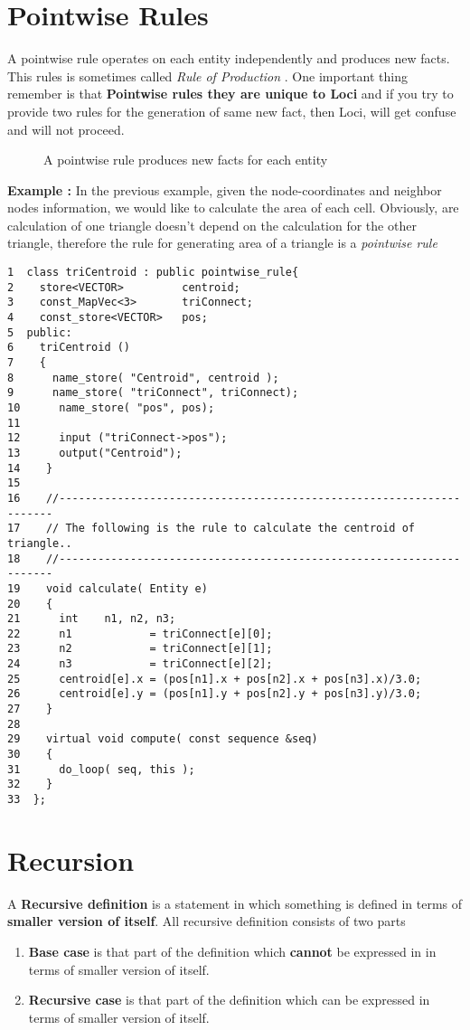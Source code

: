 \section{ Pointwise Rules }
A pointwise rule operates on each entity independently and produces new facts. This
rules is sometimes called {\em Rule of Production }.  
One important thing remember is that {\bf Pointwise rules they are unique
to Loci} and if you try to provide two rules for the generation of same new fact,
then Loci, will get confuse and will not proceed.
%
\begin{figure}[h]
\vspace{2.50in}\caption { A pointwise rule produces new facts for each entity  }
\label {FigLocalReduction}
\end{figure}
%
\par {\bf Example : } In the previous example, given the node-coordinates and 
neighbor nodes information, we would like to calculate the area of each
cell. Obviously, are calculation of one triangle doesn't depend on the 
calculation for the other triangle, therefore the rule for generating
area of a triangle is a {\em pointwise rule}
\begin{verbatim}
1  class triCentroid : public pointwise_rule{
2    store<VECTOR>         centroid;
3    const_MapVec<3>       triConnect;
4    const_store<VECTOR>   pos;
5  public:
6    triCentroid ()
7    {
8      name_store( "Centroid", centroid );
9      name_store( "triConnect", triConnect);
10      name_store( "pos", pos);
11
12      input ("triConnect->pos");
13      output("Centroid");
14    }
15
16    //---------------------------------------------------------------------
17    // The following is the rule to calculate the centroid of triangle..
18    //---------------------------------------------------------------------
19    void calculate( Entity e)
20    {
21      int    n1, n2, n3;
22      n1            = triConnect[e][0];
23      n2            = triConnect[e][1];
24      n3            = triConnect[e][2];
25      centroid[e].x = (pos[n1].x + pos[n2].x + pos[n3].x)/3.0;
26      centroid[e].y = (pos[n1].y + pos[n2].y + pos[n3].y)/3.0;
27    }
28
29    virtual void compute( const sequence &seq)
30    {
31      do_loop( seq, this );
32    }
33  };
\end{verbatim}
%
\section {Recursion}
A {\bf Recursive definition} is a statement in which something is defined
in terms of {\bf smaller version of itself}. All recursive definition 
consists of two parts
\begin{enumerate}
\item {\bf Base case} is that part of the definition which {\bf cannot} 
be expressed in in terms of smaller version of itself. 
\item {\bf Recursive case} is that part of the definition which can
be expressed in terms of smaller version of itself.
\end{enumerate}

